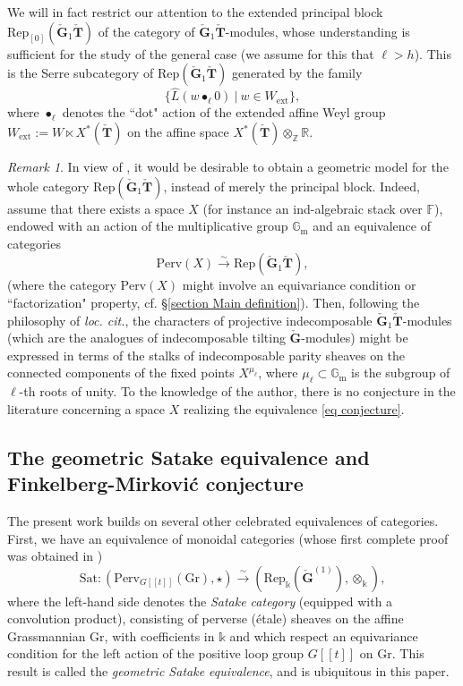 \documentclass[11pt]{amsart}
\theoremstyle{plain}
\theoremstyle{remark}
\newtheorem{rem}[thm]{Remark}
\numberwithin{equation}{section}
\begin{document}
We will in fact restrict our attention to the extended principal block $\mathrm{Rep}_{[0]}(\check{\mathbf{G}}_1\check{\mathbf{T}})$ of the category of $\check{\mathbf{G}}_1\check{\mathbf{T}}$-modules, whose
understanding is sufficient for the study of the general case (we assume for this that $\ell > h$). This is the
Serre subcategory of $\mathrm{Rep}(\check{\mathbf{G}}_1\check{\mathbf{T}})$ generated by the family
$$\{\widehat{L}(w\bullet_\ell0)~|~w\in W_{\mathrm{ext}}\},$$
where $\bullet_\ell$ denotes the ``dot" action of the extended affine Weyl group $W_{\mathrm{ext}}:=W\ltimes X^*(\check{\mathbf{T}})$ on the affine space $X^*(\check{\mathbf{T}})\otimes_\mathbb{Z}\mathbb{R}$.
\begin{rem}
    In view of \cite{riche2022smith}, it would be desirable to obtain a geometric model for the whole category $\mathrm{Rep}(\check{\mathbf{G}}_1\check{\mathbf{T}})$, instead of merely the principal block. Indeed, assume that there exists a space $X$ (for instance an ind-algebraic stack over $\mathbb{F}$), endowed with an action of the multiplicative group $\mathbb{G}_\mathrm{m}$ and an equivalence of categories \begin{equation}\label{eq conjecture}
        \mathrm{Perv}(X)\xrightarrow{\sim}\mathrm{Rep}(\check{\mathbf{G}}_1\check{\mathbf{T}}),
    \end{equation}(where the category $\mathrm{Perv}(X)$ might involve an equivariance condition or ``factorization" property, cf. §\ref{section Main definition}). Then, following the philosophy of \textit{loc. cit.}, the characters of projective indecomposable $\check{\mathbf{G}}_1\check{\mathbf{T}}$-modules (which are the analogues of indecomposable tilting $\check{\mathbf{G}}$-modules) might be expressed in terms of the stalks of indecomposable parity sheaves on the connected components of the fixed points $X^{\mu_\ell}$, where $\mu_\ell\subset\mathbb{G}_\mathrm{m}$ is the subgroup of $\ell$-th roots of unity. To the knowledge of the author, there is no conjecture in the literature concerning a space $X$ realizing the equivalence \eqref{eq conjecture}.
\end{rem}
 \subsection{The geometric Satake equivalence and Finkelberg-Mirkovi\'c conjecture} The present work builds on several other celebrated equivalences of categories. First, we have an equivalence of monoidal categories (whose first complete proof was obtained in \cite{Mirkovic2004GeometricLD})
 $$\mathrm{Sat}:(\mathrm{Perv}_{G[[t]]}(\mathrm{Gr}),\star)\xrightarrow{\sim} (\mathrm{Rep}_\mathbb{k}(\check{\mathbf{G}}^{(1)}),\otimes_\mathbb{k}),$$
 where the left-hand side denotes the \textit{Satake category} (equipped with a convolution product), consisting of perverse (\'etale) sheaves on the affine Grassmannian $\mathrm{Gr}$, with coefficients in $\mathbb{k}$ and which respect an equivariance condition for the left action of the positive loop group $G[[t]]$ on $\mathrm{Gr}$. This result is called the \textit{geometric Satake equivalence}, and is ubiquitous in this paper.
 
\end{document}
